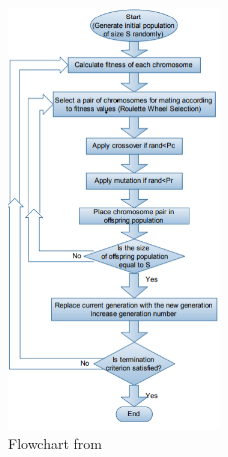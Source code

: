 \begin{figure}[h]
	\centering
	\includegraphics[width=0.5\textwidth]{figures/flowchart.png}
	\caption{Flowchart from \cite{tartan2016flow}}
	\label{fig:flowchart}
\end{figure}